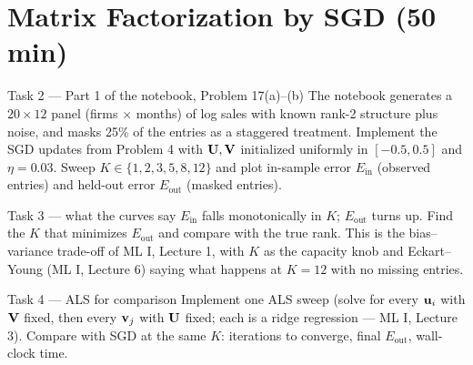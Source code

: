 \documentclass[11pt]{article}
\begin{document}
\section{Matrix Factorization by SGD (50 min)}
\begin{task}{Task 2 --- Part 1 of the notebook, Problem 17(a)--(b)}
The notebook generates a $20\times12$ panel (firms $\times$ months) of log sales with known rank-2 structure
plus noise, and masks 25\% of the entries as a staggered treatment. Implement the SGD updates from
Problem 4 with $\mathbf{U},\mathbf{V}$ initialized uniformly in $[-0.5,0.5]$ and $\eta=0.03$. Sweep $K\in\{1,2,3,5,8,12\}$
and plot in-sample error $E_{\text{in}}$ (observed entries) and held-out error $E_{\text{out}}$ (masked entries).
\end{task}
\begin{task}{Task 3 --- what the curves say}
$E_{\text{in}}$ falls monotonically in $K$; $E_{\text{out}}$ turns up. Find the $K$ that minimizes $E_{\text{out}}$
and compare with the true rank. This is the bias--variance trade-off of ML I, Lecture 1, with $K$ as the
capacity knob and Eckart--Young (ML I, Lecture 6) saying what happens at $K=12$ with no missing entries.
\end{task}
\begin{task}{Task 4 --- ALS for comparison}
Implement one ALS sweep (solve for every $\mathbf{u}_i$ with $\mathbf{V}$ fixed, then every $\mathbf{v}_j$ with $\mathbf{U}$ fixed; each
is a ridge regression --- ML I, Lecture 3). Compare with SGD at the same $K$: iterations to converge,
final $E_{\text{out}}$, wall-clock time.
\end{task}
\end{document}
